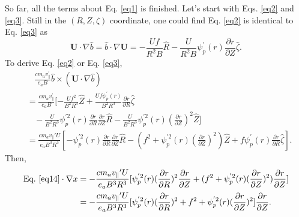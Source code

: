 \documentclass[12pt]{article}
\begin{document}
\begin{CJK*}{UTF8}{gbsn}
So far, all the terms about Eq. \ref{eq1} is finished. Let's start with Eqs. \ref{eq2} and \ref{eq3}.
Still in the $(R,Z,\zeta)$ coordinate, one could find Eq. \ref{eq2} is identical to Eq. \ref{eq3} as
\begin{equation}
    \mathbf{U}\cdot\nabla\hat{b} = \hat{b}\cdot\nabla\mathbf{U} = - \frac{Uf}{R^2B}\hat{R} - \frac{U}{R^2B}\psi_p^{'}(r)\frac{\partial r}{\partial Z}\hat{\zeta}.
\end{equation}
To derive Eq. \ref{eq2} or Eq. \ref{eq3}, 
\begin{equation}
\begin{split}
    &\ \ \ \  \frac{cm_av_{\parallel}^{'}}{e_aB} \hat{b} \times (\mathbf{U}\cdot\nabla\hat{b}) \\&= \frac{cm_av_{\parallel}^{'}}{e_aB}
    [-\frac{Uf^2}{B^2R^3}\hat{Z} + \frac{Uf\psi^{'}_p(r)}{B^2R^3}\frac{\partial r}{\partial R}\hat{\zeta}\\
     &\ \ \ \ -\frac{U}{B^2R^3}\psi_p^{'2}(r)\frac{\partial r}{\partial R}\frac{\partial r}{\partial Z}\hat{R}
     -\frac{U}{B^2R^3}\psi_p^{'2}(r)(\frac{\partial r}{\partial Z})^2\hat{Z}]\\
    &=\frac{cm_av_{\parallel}{'}U}{e_aB^3R^3}[-\psi_p^{'2}(r)\frac{\partial r}{\partial R}\frac{\partial r}{\partial Z}\hat{R}
     -(f^2 + \psi_p^{'2}(r)(\frac{\partial r}{\partial Z})^2)\hat{Z} + f\psi_p^{'}(r)\frac{\partial r}{\partial R}\hat{\zeta}].\label{eq14}
\end{split}
\end{equation}
Then, 
\begin{equation}
\begin{split}
    \textrm{Eq.}\ \ref{eq14} \cdot\nabla x &= -\frac{cm_av_{\parallel}{'}U}{e_aB^3R^3}[\psi_p^{'2}(r)(\frac{\partial r}{\partial R})^2\frac{\partial r}{\partial Z}
    +(f^2 + \psi_p^{'2}(r)(\frac{\partial r}{\partial Z})^2)\frac{\partial r}{\partial Z}]\\
    &= -\frac{cm_av_{\parallel}{'}U}{e_aB^3R^3}[\psi_p^{'2}(r)(\frac{\partial r}{\partial R})^2
       +f^2 + \psi_p^{'2}(r)(\frac{\partial r}{\partial Z})^2]\frac{\partial r}{\partial Z}.
\end{split}
\end{equation}


\end{CJK*}
\end{document}
